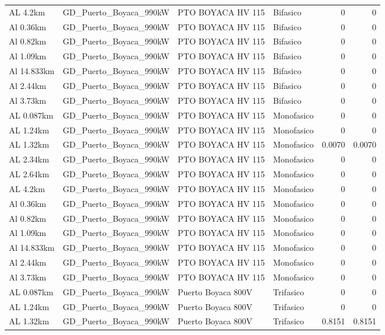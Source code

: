 \documentclass[11pt,a4paper]{article}
\begin{document}
\begin{longtable}{llllrr}
AL 4.2km & GD\_Puerto\_Boyaca\_990kW & PTO BOYACA HV 115 & Bifasico & 0 & 0 \\
Al 0.36km & GD\_Puerto\_Boyaca\_990kW & PTO BOYACA HV 115 & Bifasico & 0 & 0 \\
Al 0.82km & GD\_Puerto\_Boyaca\_990kW & PTO BOYACA HV 115 & Bifasico & 0 & 0 \\
Al 1.09km & GD\_Puerto\_Boyaca\_990kW & PTO BOYACA HV 115 & Bifasico & 0 & 0 \\
Al 14.833km & GD\_Puerto\_Boyaca\_990kW & PTO BOYACA HV 115 & Bifasico & 0 & 0 \\
Al 2.44km & GD\_Puerto\_Boyaca\_990kW & PTO BOYACA HV 115 & Bifasico & 0 & 0 \\
Al 3.73km & GD\_Puerto\_Boyaca\_990kW & PTO BOYACA HV 115 & Bifasico & 0 & 0 \\
AL 0.087km & GD\_Puerto\_Boyaca\_990kW & PTO BOYACA HV 115 & Monofasico & 0 & 0 \\
AL 1.24km & GD\_Puerto\_Boyaca\_990kW & PTO BOYACA HV 115 & Monofasico & 0 & 0 \\
AL 1.32km & GD\_Puerto\_Boyaca\_990kW & PTO BOYACA HV 115 & Monofasico & 0.0070 & 0.0070 \\
AL 2.34km & GD\_Puerto\_Boyaca\_990kW & PTO BOYACA HV 115 & Monofasico & 0 & 0 \\
AL 2.64km & GD\_Puerto\_Boyaca\_990kW & PTO BOYACA HV 115 & Monofasico & 0 & 0 \\
AL 4.2km & GD\_Puerto\_Boyaca\_990kW & PTO BOYACA HV 115 & Monofasico & 0 & 0 \\
Al 0.36km & GD\_Puerto\_Boyaca\_990kW & PTO BOYACA HV 115 & Monofasico & 0 & 0 \\
Al 0.82km & GD\_Puerto\_Boyaca\_990kW & PTO BOYACA HV 115 & Monofasico & 0 & 0 \\
Al 1.09km & GD\_Puerto\_Boyaca\_990kW & PTO BOYACA HV 115 & Monofasico & 0 & 0 \\
Al 14.833km & GD\_Puerto\_Boyaca\_990kW & PTO BOYACA HV 115 & Monofasico & 0 & 0 \\
Al 2.44km & GD\_Puerto\_Boyaca\_990kW & PTO BOYACA HV 115 & Monofasico & 0 & 0 \\
Al 3.73km & GD\_Puerto\_Boyaca\_990kW & PTO BOYACA HV 115 & Monofasico & 0 & 0 \\
AL 0.087km & GD\_Puerto\_Boyaca\_990kW & Puerto Boyaca 800V & Trifasico & 0 & 0 \\
AL 1.24km & GD\_Puerto\_Boyaca\_990kW & Puerto Boyaca 800V & Trifasico & 0 & 0 \\
AL 1.32km & GD\_Puerto\_Boyaca\_990kW & Puerto Boyaca 800V & Trifasico & 0.8151 & 0.8151 \\

\end{longtable}
\end{document}

